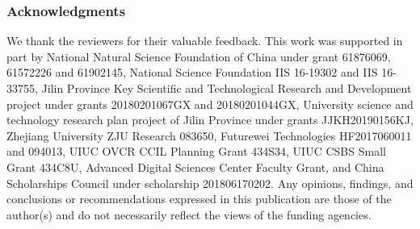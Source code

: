 \documentclass{article} \usepackage{iclr2020_conference,times}
\begin{document}
\subsubsection*{Acknowledgments}
\vspace{-1mm}
We thank the reviewers for their valuable feedback. 
This work was supported in part by National Natural Science Foundation of China under grant 61876069, 61572226 and 61902145,
National Science Foundation IIS 16-19302 and IIS 16-33755,
Jilin Province Key Scientific and Technological Research and Development project under grants 20180201067GX and 20180201044GX, 
University science and technology research plan project of Jilin Province under grants JJKH20190156KJ, 
Zhejiang University ZJU Research 083650, Futurewei Technologies HF2017060011 and 094013, UIUC OVCR CCIL Planning Grant 434S34, UIUC CSBS Small Grant 434C8U, Advanced Digital Sciences Center Faculty Grant, 
and China Scholarships Council under scholarship 201806170202.
Any opinions, findings, and conclusions or recommendations expressed in this publication are those of the author(s) and do not necessarily reflect the views of the funding agencies.




\end{document}
